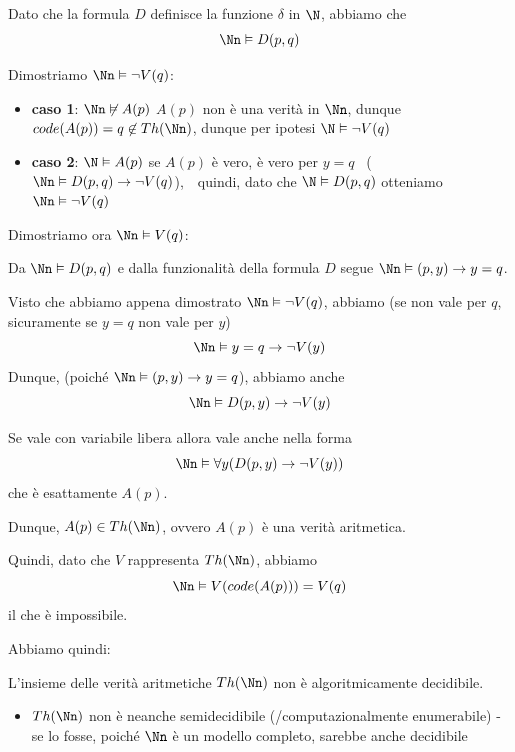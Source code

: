 \documentclass[a4paper,11pt]{report}
\begin{document}
\begin{proofframe}[title=dim fatta in classe]
Dato che la formula \( D\) definisce la funzione \( \delta \) in \( \N \), abbiamo che
\[ \Nn \vDash D(p, q) \]

Dimostriamo \( \Nn \vDash \neg V(q) \):
\begin{itemize}
    \item \textbf{caso 1}: \( \Nn \not\vDash A(p) \) 
        \subitem \( A(p) \) non è una verità in \( \Nn \), dunque \( code(A(p)) = q \not\in Th(\Nn) \), dunque per ipotesi \( \N \vDash \neg V(q) \)
    \item \textbf{caso 2}: \( \N \vDash A(p) \) 
        \subitem se \( A(p) \) è vero, è vero per \( y = q \) \ {\color{gray}\small(\( \Nn \vDash D(p, q)\to \neg V(q) \))},\ \  quindi, dato che \( \N \vDash D(p, q) \) otteniamo \( \Nn \vDash \neg V(q) \)
\end{itemize}


Dimostriamo ora \( \Nn \vDash V(q) \):

Da \( \Nn\vDash D(p,q) \) e dalla funzionalità della formula \( D \) segue \( \Nn \vDash (p, y ) \to y = q \).

Visto che abbiamo appena dimostrato \( \Nn \vDash \neg V(q) \), abbiamo {\color{gray}\small(se non vale per \( q \), sicuramente se \( y=q \) non vale per \( y \))}
\[ \Nn \vDash y = q \to \neg V(y) \]
Dunque, {\color{gray}\small(poiché \( \Nn \vDash (p, y ) \to y = q \))}, abbiamo anche
\[ \Nn \vDash D(p, y)\to \neg V(y) \]

Se vale con variabile libera allora vale anche nella forma
\[ \Nn \vDash \forall y (D(p, y)\to \neg V(y)) \]
che è esattamente \( A(p) \).

Dunque, \( A(p)\in Th(\Nn) \), ovvero \( A(p) \) è una verità aritmetica.

Quindi, dato che \( V \) rappresenta \( Th(\Nn) \), abbiamo
\[ \Nn \vDash V(code(A(p))) = V(q) \]
il che è impossibile.
\end{proofframe}

Abbiamo quindi:
\begin{corframe}{}{}
    L'insieme delle verità aritmetiche \( Th(\Nn) \) non è algoritmicamente decidibile.
\end{corframe}

\begin{itemize}
    \item \( Th(\Nn) \) non è neanche semidecidibile (/computazionalmente enumerabile) - se lo fosse, poiché \( \Nn \) è un modello completo, sarebbe anche decidibile
\end{itemize}
\end{document}
